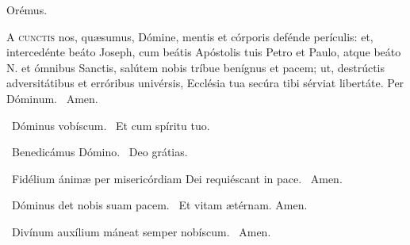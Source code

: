 Orémus. 

\lettrine[lines=2]{A}{} \textsc{cunctis} nos, quæsumus, Dómine, mentis et córporis defénde perículis: et, intercedénte beáto Joseph, cum beátis Apóstolis tuis Petro et Paulo, atque beáto N. et ómnibus Sanctis, salútem nobis tríbue benígnus et pacem; ut, destrúctis adversitátibus et erróribus univérsis, Ecclésia tua secúra tibi sérviat libertáte. Per Dóminum. \R\ Amen.


\V\ Dóminus vobíscum. \R\ Et cum spíritu tuo.

\V\ Benedicámus Dómino. \R\ Deo grátias.

\V\ Fidélium ánimæ per misericórdiam Dei requiéscant in pace. \R\ Amen.


\V\ Dóminus det nobis suam pacem. \R\ Et vitam ætérnam. Amen.



\V\ Divínum auxílium máneat semper nobíscum. \R\ Amen.

